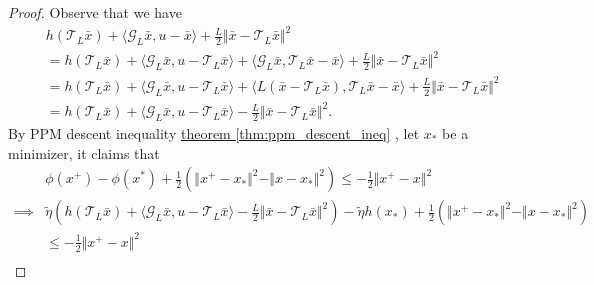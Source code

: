 \documentclass[12pt]{article}
\begin{document}
    \begin{proof}
        Observe that we have 
        \begin{align*}
            \quad &
            h(\mathcal T_L\bar x) + 
            \langle \mathcal G_L \bar x, u - \bar x\rangle + 
            \frac{L}{2}\Vert \bar x - \mathcal T_L \bar x\Vert^2
            \\
            &= 
            h(\mathcal T_L \bar x) + 
            \langle \mathcal G_L \bar x, u - \mathcal T_L \bar x\rangle
            + 
            \langle \mathcal G_L \bar x, \mathcal T_L \bar x - \bar x\rangle
            + 
            \frac{L}{2}\Vert \bar x - \mathcal T_L \bar x \Vert^2
            \\
            &= 
            h(\mathcal T_L \bar x) + 
            \langle \mathcal G_L \bar x, u - \mathcal T_L \bar x\rangle
            + 
            \langle 
                L (\bar x - \mathcal T_L \bar x)
                , 
                \mathcal T_L \bar x - \bar x
            \rangle
            + 
            \frac{L}{2}\Vert \bar x - \mathcal T_L \bar x\Vert^2
            \\
            &= 
            h(\mathcal T_L \bar x) + 
            \langle \mathcal G_L \bar x, u - \mathcal T_L \bar x\rangle 
            - \frac{L}{2} \Vert \bar x - \mathcal T_L \bar x\Vert^2. 
        \end{align*}
        By PPM descent inequality
        \hyperref[thm:ppm_descent_ineq]{theorem \ref*{thm:ppm_descent_ineq}}
        , let $x_*$ be a minimizer, it claims that 
        {\small
        \begin{align*}
            & 
            \phi(x^+) - \phi (x^*) + 
            \frac{1}{2}\left(
                \Vert x^+ - x_*\Vert^2 - 
                \Vert x - x_*\Vert^2
            \right)
            \le 
            - \frac{1}{2}\Vert x^+ - x\Vert^2
            \\
            \implies &
            \tilde 
            \eta 
            \left(   
                h(\mathcal T_L \bar x) + 
                \langle \mathcal G_L \bar x, u - \mathcal T_L \bar x\rangle 
                - \frac{L}{2} \Vert \bar x - \mathcal T_L \bar x\Vert^2
            \right)
            - \tilde \eta h (x_*)
            +
            \frac{1}{2}\left(
                \Vert x^+ - x_*\Vert^2 - 
                \Vert x - x_*\Vert^2
            \right)
            \\
            &\le 
            - \frac{1}{2}\Vert x^+ - x\Vert^2
            \\

\end{align*}}
\end{proof}
\end{document}
